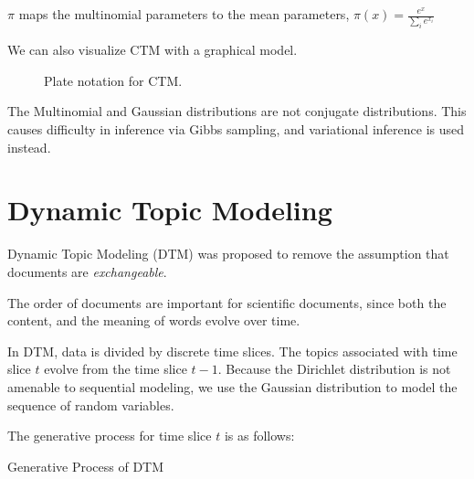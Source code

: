\documentclass[letterpaper]{article}
\begin{document}
$\pi$ maps the multinomial parameters to the mean parameters,
$\pi\left( x \right) = \frac{e^x}{\sum_{i} e^{x_i}}$

We can also visualize CTM with a graphical model.

\begin{figure}[ht]
  \centering
  \caption{\label{fig:ctm_plate} Plate notation for CTM.}
\end{figure}


The Multinomial and Gaussian distributions are not conjugate
distributions. This causes difficulty in inference via Gibbs sampling,
and variational inference is used instead.

\section{Dynamic Topic Modeling}
\label{sec:dtm}
Dynamic Topic Modeling (DTM) was proposed to remove the assumption
that documents are \textit{exchangeable}. \cite{blei2006dynamic}

The order of documents are important for scientific documents, since
both the content, and the meaning of words evolve over time.

In DTM, data is divided by discrete time slices. The topics associated
with time slice $t$ evolve from the time slice $t-1$. Because the
Dirichlet distribution is not amenable to sequential modeling, we use
the Gaussian distribution to model the sequence of random variables.

The generative process for time slice $t$ is as follows:

\begin{algorithm}
  \caption{Generative Process of DTM}\label{alg:DTM}
  \begin{algorithmic}[1]
    \EndFor
    \EndFor
  \end{algorithmic}
\end{algorithm}
\end{document}
